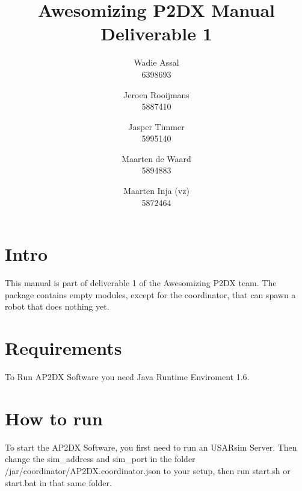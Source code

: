 \documentclass[a4paper, notitlepage]{article}
\title{Awesomizing P2DX Manual Deliverable 1}
\author{Wadie Assal \\ 6398693 \and Jeroen Rooijmans \\ 5887410 \and Jasper Timmer \\ 5995140 \and Maarten de Waard \\ 5894883 \and Maarten Inja (vz) \\ 5872464}
\begin{document}
\maketitle

\section{Intro}
This manual is part of deliverable 1 of the Awesomizing P2DX team. The package contains empty modules, except for the coordinator, that can spawn a robot that does nothing yet.

\section{Requirements}
To Run AP2DX Software you need Java Runtime Enviroment 1.6. 

\section{How to run}
To start the AP2DX Software, you first need to run an USARsim Server. Then change the sim\_address and sim\_port in the folder /jar/coordinator/AP2DX.coordinator.json to your setup, then run start.sh or start.bat in that same folder.
\end{document}
